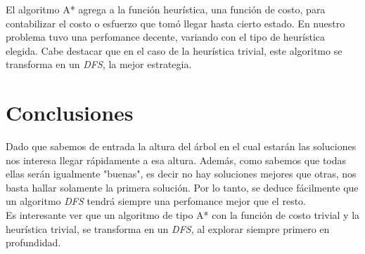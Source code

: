 \documentclass[a4paper,10pt]{article}
\begin{document}
    El algoritmo A* agrega a la función heurística, una función de costo, para contabilizar el costo o esfuerzo que tomó llegar hasta cierto estado. En nuestro problema tuvo una 
    perfomance decente, variando con el tipo de heurística elegida. Cabe destacar que en el caso de la heurística trivial, este algoritmo se transforma en un \textit{DFS}, la mejor 
    estrategia.

\section{Conclusiones}
    Dado que sabemos de entrada la altura del árbol en el cual estarán las soluciones nos interesa llegar rápidamente a esa altura. Además, como sabemos que todas ellas serán 
    igualmente "buenas", es decir no hay soluciones mejores que otras, nos basta hallar solamente la primera solución. Por lo tanto, se deduce fácilmente que un algoritmo 
    \textit{DFS} tendrá siempre una perfomance mejor que el resto. \\

    Es interesante ver que un algoritmo de tipo A* con la función de costo trivial y la heurística trivial, se transforma en un \textit{DFS}, al explorar siempre 
    primero en profundidad. \\
\end{document}
